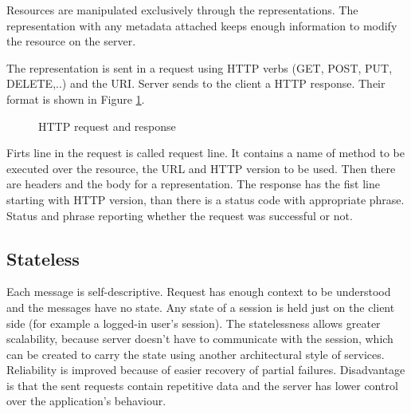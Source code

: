 Resources are manipulated exclusively through the representations. The representation with any metadata attached keeps enough information to modify the resource on the server.


The representation is sent in a request using HTTP verbs (GET, POST, PUT, DELETE,..) and the URI. Server sends to the client a HTTP response. Their format is shown in Figure \ref{fig:http}.

\begin{figure}[htp] 
\caption{HTTP request and response}
\label{fig:http}
\end{figure} 

Firts line in the request is called request line. It contains a name of method to be executed over the resource, the URL and HTTP version to be used. Then there are headers and the body for a representation. The response has the fist line starting with HTTP version, than there is a status code with appropriate phrase. Status and phrase reporting whether the request was successful or not.

\subsection{Stateless}
  
Each message is self-descriptive. Request has enough context to be understood and the messages have no state. Any state of a \gls{session} is held just on the client side (for example a logged-in user's session).
The statelessness allows greater scalability, because server doesn't have to communicate with the session, which can be created to carry the state using another architectural style of services. Reliability is improved because of easier recovery of partial failures. Disadvantage is that the sent requests contain repetitive data and the server has lower control over the application's behaviour.


